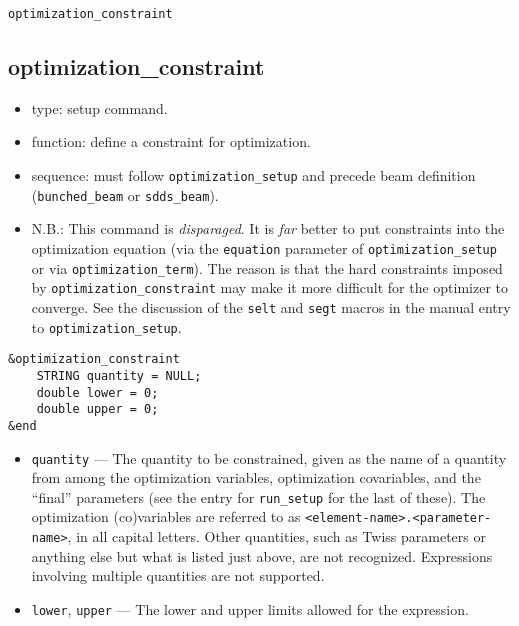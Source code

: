 \documentclass[11pt]{article}
\begin{document}
\newpage
\begin{center}{\Large\verb|optimization_constraint|}\end{center}
\subsection{optimization\_constraint \label{subsec:optimizationconstraint}}

\begin{itemize}
\item type: setup command.
\item function: define a constraint for optimization.
\item sequence: must follow \verb|optimization_setup| and precede beam definition (\verb|bunched_beam| or \verb|sdds_beam|).
\item N.B.: This command is {\em disparaged}. It is {\em far} better to put constraints
	into the optimization equation (via the \verb|equation| parameter of
	\verb|optimization_setup| or via \verb|optimization_term|).  The reason
	is that the hard constraints imposed by \verb|optimization_constraint|
	may make it more difficult for the optimizer to converge.  See the discussion of the
        \verb|selt| and \verb|segt| macros in the manual entry to \verb|optimization_setup|.
\end{itemize}

\begin{verbatim}
&optimization_constraint
    STRING quantity = NULL;
    double lower = 0;
    double upper = 0;
&end
\end{verbatim}

\begin{itemize}

\item \verb|quantity| --- The quantity to be constrained, given as the
name of a quantity from among the optimization variables, optimization
covariables, and the ``final'' parameters (see the entry for
\verb|run_setup| for the last of these).  The optimization
(co)variables are referred to as
\verb|<element-name>.<parameter-name>|, in all capital letters.  Other
quantities, such as Twiss parameters or anything else but what is
listed just above, are not recognized.  Expressions involving multiple
quantities are not supported.

\item \verb|lower|, \verb|upper| --- The lower and upper limits
allowed for the expression.

\end{itemize}
\end{document}
